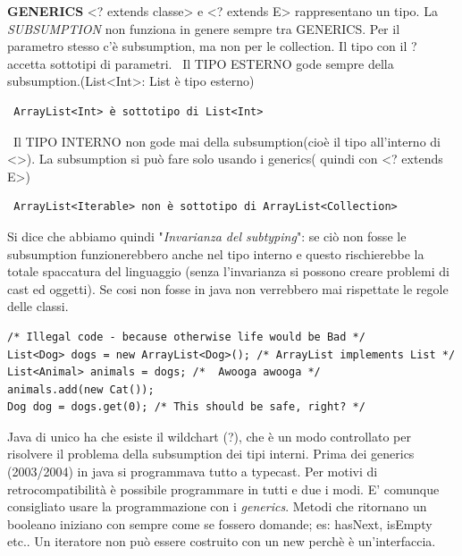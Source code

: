 \noindent \textbf{GENERICS}\newline
<? extends classe> e <? extends E> rappresentano un tipo. \newline
La \textit{SUBSUMPTION} non funziona in genere sempre tra GENERICS. Per il parametro stesso c'è subsumption, ma non per le collection. Il tipo con il ? accetta sottotipi di parametri.\newline
\textbullet\ Il TIPO ESTERNO gode sempre della subsumption.(List<Int>: List è tipo esterno)
\begin{lstlisting}
 ArrayList<Int> è sottotipo di List<Int>
\end{lstlisting}
\noindent \textbullet\ Il TIPO INTERNO non gode mai della subsumption(cioè il tipo all'interno di <>). La subsumption si può fare solo usando i generics( quindi con <? extends E>)
\begin{lstlisting}
 ArrayList<Iterable> non è sottotipo di ArrayList<Collection>
\end{lstlisting}
\noindent Si dice che abbiamo quindi "\textit{Invarianza del subtyping}": se ciò non fosse le subsumption funzionerebbero anche nel tipo interno e questo rischierebbe la totale spaccatura del linguaggio (senza l'invarianza si possono creare problemi di cast ed oggetti).\newline
Se cosi non fosse in java non verrebbero mai rispettate le regole delle classi.
\begin{lstlisting}
/* Illegal code - because otherwise life would be Bad */
List<Dog> dogs = new ArrayList<Dog>(); /* ArrayList implements List */
List<Animal> animals = dogs; /*  Awooga awooga */
animals.add(new Cat());
Dog dog = dogs.get(0); /* This should be safe, right? */
\end{lstlisting}

\noindent Java di unico ha che esiste il wildchart (?), che è un modo controllato per risolvere il problema della subsumption dei tipi interni. \newline
Prima dei generics (2003/2004) in java si programmava tutto a typecast. Per motivi di retrocompatibilità è possibile programmare in tutti e due i modi. E' comunque consigliato usare la programmazione con i \textit{generics}. \newline
Metodi che ritornano un booleano iniziano con sempre come se fossero domande; es: hasNext, isEmpty etc.. \newline
Un iteratore non può essere costruito con un new perchè è un'interfaccia. 
\newpage
